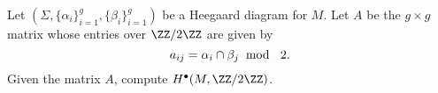 

    Let $(\Sigma, \{\alpha_i\}_{i=1}^g, \{\beta_i\}_{i=1}^g)$ be a Heegaard diagram for $M$. Let $A$ be the $g\times g$ matrix whose entries over $\ZZ/2\ZZ$ are given by  
    \[a_{ij}=\alpha_{i}\cap \beta_j \text{\;\;mod \;\;} 2.\] 
    Given the matrix $A$, compute $H^\bullet(M, \ZZ/2\ZZ)$.

